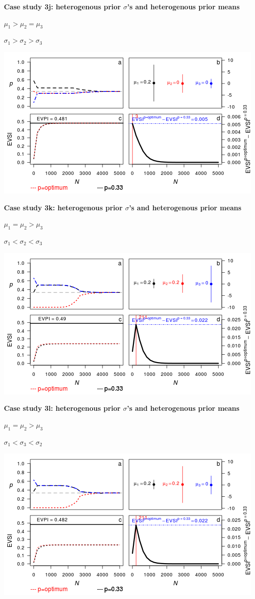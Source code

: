 \documentclass[]{article}
\theoremstyle{definition}
\theoremstyle{definition}
\theoremstyle{remark}
\begin{document}
\textbf{Case study 3j: heterogenous prior \(\sigma\)'s and heterogenous
prior means}

\(\mu_1 > \mu_2 = \mu_3\)

\(\sigma_1 > \sigma_2 > \sigma_3\)

\includegraphics{figure/x100___1__1_1c-1.png} \clearpage

\textbf{Case study 3k: heterogenous prior \(\sigma\)'s and heterogenous
prior means}

\(\mu_1 = \mu_2 > \mu_3\)

\(\sigma_1 < \sigma_2 < \sigma_3\)

\includegraphics{figure/x110_1__1___1c-1.png} \clearpage

\textbf{Case study 3l: heterogenous prior \(\sigma\)'s and heterogenous
prior means}

\(\mu_1 = \mu_2 > \mu_3\)

\(\sigma_1 < \sigma_3 < \sigma_2\)

\includegraphics{figure/x110_1___1__1c-1.png} \clearpage  
\end{document}
